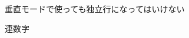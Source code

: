 \documentclass{article}
\begin{document}
\parindent0pt
垂直モードで使っても独立行になってはいけない\par
{}連数字
\end{document}
